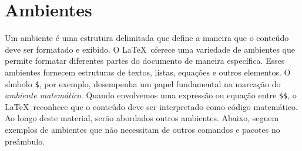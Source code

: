 \section{Ambientes}
\label{sec:7}
\noindent Um ambiente \'e uma estrutura delimitada que define a maneira que o conte\'udo deve ser formatado e exibido. O \LaTeX\ oferece uma variedade de ambientes que permite formatar diferentes partes do documento de maneira espec\'ifica. Esses ambientes fornecem estruturas de textos, listas, equa\c c\~oes e outros elementos. O s\'imbolo \verb|$|, por exemplo, desempenha um papel fundamental na marca\c c\~ao do \textit{ambiente matemático}. Quando envolvemos uma express\~ao ou equa\c c\~ao entre \verb|$$|, o \LaTeX\ reconhece que o conte\'udo deve ser interpretado como c\'odigo matem\'atico. Ao longo deste material, ser\~ao abordados outros ambientes. Abaixo, seguem exemplos de ambientes que n\~ao necessitam de outros comandos e pacotes no pre\^ambulo. 




